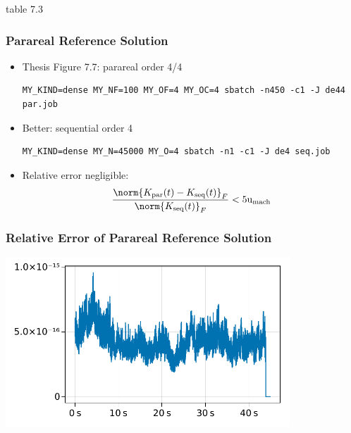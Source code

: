 \documentclass[
  aspectratio=1610,
]{beamer}
\begin{document}
\begin{frame}
  table 7.3
\end{frame}

\renewcommand\mathrm\mathsf %
\newcommand\sidenote[1]{\footnotesize{\textcolor{gray}{#1}}}

\begin{frame}[fragile]
  \frametitle{Parareal Reference Solution}
  \begin{itemize}
    \item
      Thesis Figure 7.7: parareal order 4/4

      \begin{lstlisting}
MY_KIND=dense MY_NF=100 MY_OF=4 MY_OC=4 sbatch -n450 -c1 -J de44 par.job
      \end{lstlisting}
    \item
      Better: sequential order 4

      \begin{lstlisting}
MY_KIND=dense MY_N=45000 MY_O=4 sbatch -n1 -c1 -J de4 seq.job
      \end{lstlisting}
    \item
      Relative error negligible:
      \begin{equation*}
        \frac{\norm{K_\text{par}(t) - K_\text{seq}(t)}_F}{\norm{K_\text{seq}(t)}_F}
        < 5\umach
      \end{equation*}
  \end{itemize}
\end{frame}

\begin{frame}
  \frametitle{Relative Error of Parareal Reference Solution}
  \includegraphics[width=0.8\textwidth]{figures/slides-seq-parareal-ref.pdf}
\end{frame}
\end{document}
